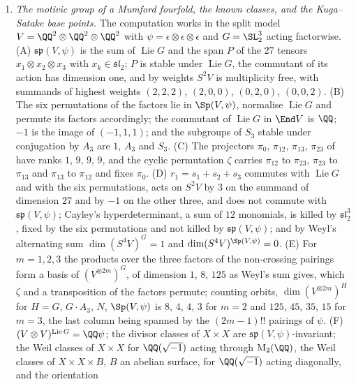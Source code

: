 \begin{enumerate}[label=\textup{(\Roman*)},leftmargin=*]
\item \emph{The motivic group of a Mumford fourfold, the known classes, and
  the Kuga--Satake base points.} The computation works in the split model
  $V=\QQ^{2}\otimes\QQ^{2}\otimes\QQ^{2}$ with
  $\psi=\epsilon\otimes\epsilon\otimes\epsilon$ and $G=\SL_{2}^{3}$ acting
  factorwise. (A) $\mathfrak{sp}(V,\psi)$ is the sum of
  $\operatorname{Lie}G$ and the span $P$ of the $27$ tensors
  $x_{1}\otimes x_{2}\otimes x_{3}$ with $x_{k}\in\mathfrak{sl}_{2}$; $P$ is
  stable under $\operatorname{Lie}G$, the commutant of its action has
  dimension one, and by weights $S^{2}V$ is multiplicity free, with summands of
  highest weights $(2,2,2)$, $(2,0,0)$, $(0,2,0)$, $(0,0,2)$. (B) The six
  permutations of the factors lie in $\Sp(V,\psi)$, normalise
  $\operatorname{Lie}G$ and permute its factors accordingly; the commutant of
  $\operatorname{Lie}G$ in $\End V$ is $\QQ$; $-1$ is the image of
  $(-1,1,1)$; and the subgroups of $S_{3}$ stable under conjugation by $A_{3}$
  are $1$, $A_{3}$ and $S_{3}$. (C) The projectors $\pi_{0}$, $\pi_{12}$,
  $\pi_{13}$, $\pi_{23}$ of  have ranks $1$, $9$, $9$,
  $9$, and the cyclic permutation $\zeta$ carries $\pi_{12}$ to $\pi_{23}$,
  $\pi_{23}$ to $\pi_{13}$ and $\pi_{13}$ to $\pi_{12}$ and fixes $\pi_{0}$.
  (D) $r_{1}=s_{1}+s_{2}+s_{3}$ commutes with $\operatorname{Lie}G$ and with
  the six permutations, acts on $S^{2}V$ by $3$ on the summand of dimension
  $27$ and by $-1$ on the other three, and does not commute with
  $\mathfrak{sp}(V,\psi)$; Cayley's hyperdeterminant, a sum of $12$
  monomials, is killed by $\mathfrak{sl}_{2}^{3}$, fixed by the six
  permutations and not killed by $\mathfrak{sp}(V,\psi)$; and by Weyl's
  alternating sum $\dim(S^{4}V)^{G}=1$ and $\dim(S^{4}V)^{\Sp(V,\psi)}=0$.
  (E) For $m=1,2,3$ the products over the three factors of the non-crossing
  pairings form a basis of $(V^{\otimes2m})^{G}$, of dimension $1$, $8$,
  $125$ as Weyl's sum gives, which $\zeta$ and a transposition of the factors
  permute; counting orbits, $\dim(V^{\otimes2m})^{H}$ for $H=G$, $G\cdot
  A_{3}$, $N$, $\Sp(V,\psi)$ is $8$, $4$, $4$, $3$ for $m=2$ and $125$, $45$,
  $35$, $15$ for $m=3$, the last column being spanned by the $(2m-1)!!$
  pairings of $\psi$. (F) $(V\otimes V)^{\operatorname{Lie}G}=\QQ\psi$; the
  divisor classes of $X\times X$ are $\mathfrak{sp}(V,\psi)$-invariant; the
  Weil classes of $X\times X$ for $\QQ(\sqrt{-1})$ acting through
  $\mathrm{M}_{2}(\QQ)$, the Weil classes of $X\times X\times B$, $B$ an
  abelian surface, for $\QQ(\sqrt{-1})$ acting diagonally, and the orientation

\end{enumerate}
